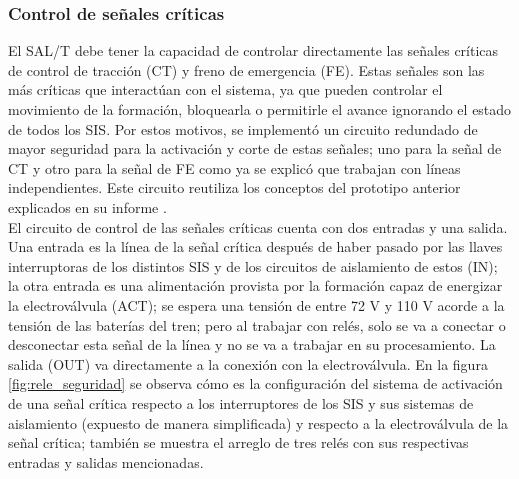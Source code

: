 \subsubsection{Control de señales críticas}

El SAL/T debe tener la capacidad de controlar directamente las señales críticas de control de tracción (CT) y freno de emergencia (FE). Estas señales son las más críticas que interactúan con el sistema, ya que pueden controlar el movimiento de la formación, bloquearla o permitirle el avance ignorando el estado de todos los SIS. Por estos motivos, se implementó un circuito redundado de mayor seguridad para la activación y corte de estas señales; uno para la señal de CT y otro para la señal de FE como ya se explicó que trabajan con líneas independientes. Este circuito reutiliza los conceptos del prototipo anterior explicados en su informe \cite{salt_ivan}.  \\ 

El circuito de control de las señales críticas cuenta con dos entradas y una salida. Una entrada es la línea de la señal crítica después de haber pasado por las llaves interruptoras de los distintos SIS y de los circuitos de aislamiento de estos (IN); la otra entrada es una alimentación provista por la formación capaz de energizar la electroválvula (ACT); se espera una tensión de entre 72 V y 110 V acorde a la tensión de las baterías del tren; pero al trabajar con relés, solo se va a conectar o desconectar esta señal de la línea y no se va a trabajar en su procesamiento. La salida (OUT) va directamente a la conexión con la electroválvula. En la figura \ref{fig:rele_seguridad} se observa cómo es la configuración del sistema de activación de una señal crítica respecto a los interruptores de los SIS y sus sistemas de aislamiento (expuesto de manera simplificada) y respecto a la electroválvula de la señal crítica; también se muestra el arreglo de tres relés con sus respectivas entradas y salidas mencionadas. 

